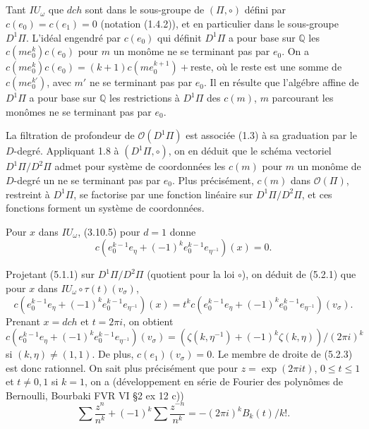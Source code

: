 \documentclass[11pt,a4paper]{article}
\theoremstyle{plain}
\theoremstyle{definition}
\newcommand{\dch}{\mathit{dch}}
\newcommand{\Q}{\mathbb{Q}}
\begin{document}
\subsection{}
Tant $IU_\omega$ que $\dch$ sont dans le sous-groupe de $(\Pi, \circ)$ d\'efini par $c(e_0) = c(e_1) = 0$ (notation (1.4.2)), et en particulier dans le sous-groupe $D^1\Pi$. L'id\'eal engendr\'e par $c(e_0)$ qui d\'efinit $D^1\Pi$ a pour base sur $\Q$ les $c(me_0^k)c(e_0)$ pour $m$ un mon\^ome ne se terminant pas par $e_0$. On a $c(me_0^k)c(e_0) = (k+1)c(me_0^{k+1}) + \text{reste}$, o\`u le reste est une somme de $c(me_0^{k'})$, avec $m'$ ne se terminant pas par $e_0$. Il en r\'esulte que l'alg\'ebre affine de $D^1\Pi$ a pour base sur $\Q$ les restrictions \`a $D^1\Pi$ des $c(m)$, $m$ parcourant les mon\^omes ne se terminant pas par $e_0$.

La filtration de profondeur de $\mathcal{O}(D^1\Pi)$ est associ\'ee (1.3) \`a sa graduation par le $D$-degr\'e. Appliquant 1.8 \`a $(D^1\Pi, \circ)$, on en d\'eduit que le sch\'ema vectoriel $D^1\Pi/D^2\Pi$ admet pour syst\`eme de coordonn\'ees les $c(m)$ pour $m$ un mon\^ome de $D$-degr\'e un ne se terminant pas par $e_0$. Plus pr\'ecis\'ement, $c(m)$ dans $\mathcal{O}(\Pi)$, restreint \`a $D^1\Pi$, se factorise par une fonction lin\'eaire sur $D^1\Pi/D^2\Pi$, et ces fonctions forment un syst\`eme de coordonn\'ees.

Pour $x$ dans $IU_\omega$, (3.10.5) pour $d=1$ donne
\begin{equation}\label{eq:5.2.1}
c(e_0^{k-1}e_\eta + (-1)^k e_0^{k-1}e_{\eta^{-1}})(x) = 0.
\end{equation}

Projetant (5.1.1) sur $D^1\Pi/D^2\Pi$ (quotient pour la loi $\circ$), on d\'eduit de (5.2.1) que pour $x$ dans $IU_\omega \circ \tau(t)(v_\sigma)$,
\begin{equation}\label{eq:5.2.2}
c(e_0^{k-1}e_\eta + (-1)^k e_0^{k-1}e_{\eta^{-1}})(x) = t^k c(e_0^{k-1}e_\eta + (-1)^k e_0^{k-1}e_{\eta^{-1}})(v_\sigma).
\end{equation}
Prenant $x = \dch$ et $t = 2\pi i$, on obtient
\begin{equation}\label{eq:5.2.3}
c(e_0^{k-1}e_\eta + (-1)^k e_0^{k-1}e_{\eta^{-1}})(v_\sigma) = (\zeta(k, \eta^{-1}) + (-1)^k \zeta(k, \eta))/(2\pi i)^k
\end{equation}
si $(k, \eta) \neq (1,1)$. De plus, $c(e_1)(v_\sigma) = 0$. Le membre de droite de (5.2.3) est donc rationnel. On sait plus pr\'ecis\'ement que pour $z = \exp(2\pi it)$, $0 \leq t \leq 1$ et $t \neq 0, 1$ si $k=1$, on a (d\'eveloppement en s\'erie de Fourier des polyn\^omes de Bernoulli, Bourbaki FVR VI \S 2 ex 12 c))
\begin{equation}\label{eq:5.2.4}
\sum \frac{z^n}{n^k} + (-1)^k \sum \frac{z^{-n}}{n^k} = -(2\pi i)^k B_k(t)/k!.
\end{equation}
\end{document}
